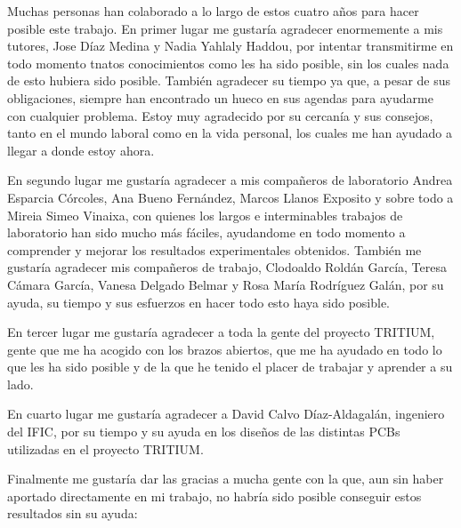 Muchas personas han colaborado a lo largo de estos cuatro años para hacer posible este trabajo. En primer lugar me gustaría agradecer enormemente a mis tutores, Jose Díaz Medina y Nadia Yahlaly Haddou, por intentar transmitirme en todo momento tnatos conocimientos como les ha sido posible, sin los cuales nada de esto hubiera sido posible. También agradecer su tiempo ya que, a pesar de sus obligaciones, siempre han encontrado un hueco en sus agendas para ayudarme con cualquier problema. Estoy muy agradecido por su cercanía y sus consejos, tanto en el mundo laboral como en la vida personal, los cuales me han ayudado a llegar a donde estoy ahora.

En segundo lugar me gustaría agradecer a mis compañeros de laboratorio Andrea Esparcia Córcoles, Ana Bueno Fernández, Marcos Llanos Exposito y sobre todo a Mireia Simeo Vinaixa, con quienes los largos e interminables trabajos de laboratorio han sido mucho más fáciles, ayudandome en todo momento a comprender y mejorar los resultados experimentales obtenidos.  También me gustaría agradecer mis compañeros de trabajo, Clodoaldo Roldán García, Teresa Cámara García, Vanesa Delgado Belmar y Rosa María Rodríguez Galán, por su ayuda, su tiempo y sus esfuerzos en hacer todo esto haya sido posible.

En tercer lugar me gustaría agradecer a toda la gente del proyecto TRITIUM, gente que me ha acogido con los brazos abiertos, que me ha ayudado en todo lo que les ha sido posible y de la que he tenido el placer de trabajar y aprender a su lado.

En cuarto lugar me gustaría agradecer a David Calvo Díaz-Aldagalán, ingeniero del IFIC, por su tiempo y su ayuda en los diseños de las distintas PCBs utilizadas en el proyecto TRITIUM.

Finalmente me gustaría dar las gracias a mucha gente con la que, aun sin haber aportado directamente en mi trabajo, no habría sido posible conseguir estos resultados sin su ayuda:

